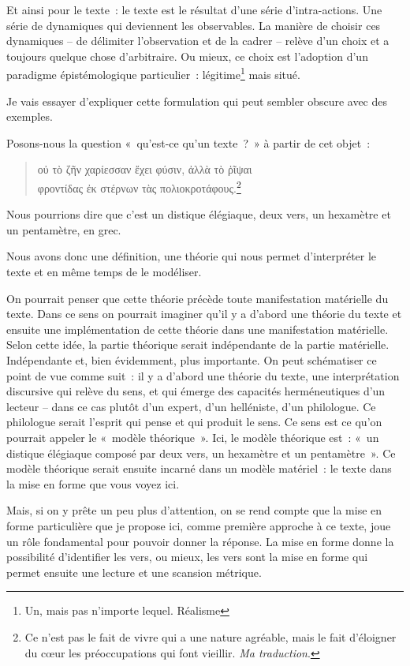 Et ainsi pour le texte~: le texte est le résultat d'une série
d'intra-actions. Une série de dynamiques qui deviennent les observables.
La manière de choisir ces dynamiques -- de délimiter l'observation et de
la cadrer -- relève d'un choix et a toujours quelque chose d'arbitraire.
Ou mieux, ce choix est l'adoption d'un paradigme épistémologique
particulier~: légitime\footnote{Un, mais pas n'importe lequel. Réalisme}
mais situé.

Je vais essayer d'expliquer cette formulation qui peut sembler obscure
avec des exemples.

Posons-nous la question «~qu'est-ce qu'un texte~?~» à partir de cet
objet~:

\begin{quote}
οὐ τὸ ζῆν χαρίεσσαν ἔχει φύσιν, ἀλλὰ τὸ ῥῖψαι\\
φροντίδας ἐκ στέρνων τὰς πολιοκροτάφους.\footnote{Ce n'est pas le fait
  de vivre qui a une nature agréable, mais le fait d'éloigner du c\oe ur
  les préoccupations qui font vieillir. \emph{Ma traduction}.}
\end{quote}

Nous pourrions dire que c'est un distique élégiaque, deux vers, un
hexamètre et un pentamètre, en grec.

Nous avons donc une définition, une théorie qui nous permet
d'interpréter le texte et en même temps de le modéliser.

On pourrait penser que cette théorie précède toute manifestation
matérielle du texte. Dans ce sens on pourrait imaginer qu'il y a d'abord
une théorie du texte et ensuite une implémentation de cette théorie dans
une manifestation matérielle. Selon cette idée, la partie théorique
serait indépendante de la partie matérielle. Indépendante et, bien
évidemment, plus importante. On peut schématiser ce point de vue comme
suit~: il y a d'abord une théorie du texte, une interprétation
discursive qui relève du sens, et qui émerge des capacités
herméneutiques d'un lecteur -- dans ce cas plutôt d'un expert, d'un
helléniste, d'un philologue. Ce philologue serait l'esprit qui pense et
qui produit le sens. Ce sens est ce qu'on pourrait appeler le «~modèle
théorique~». Ici, le modèle théorique est~: «~un distique élégiaque
composé par deux vers, un hexamètre et un pentamètre~». Ce modèle
théorique serait ensuite incarné dans un modèle matériel~: le texte dans
la mise en forme que vous voyez ici.

Mais, si on y prête un peu plus d'attention, on se rend compte que la
mise en forme particulière que je propose ici, comme première approche à
ce texte, joue un rôle fondamental pour pouvoir donner la réponse. La
mise en forme donne la possibilité d'identifier les vers, ou mieux, les
vers sont la mise en forme qui permet ensuite une lecture et une
scansion métrique.

